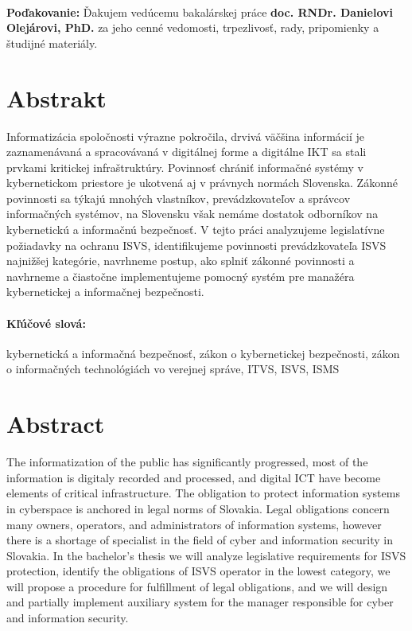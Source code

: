 \documentclass[12pt, twoside]{book}
\begin{document}


\newpage 
\pagestyle{plain}
~

\vfill
{\bf Poďakovanie:} Ďakujem vedúcemu bakalárskej práce \textbf{doc. RNDr. Danielovi Olejárovi, PhD.} za jeho cenné vedomosti,
trpezlivosť, rady, pripomienky a študijné materiály.


\newpage 
\section*{Abstrakt}
Informatizácia spoločnosti výrazne pokročila, drvivá väčšina informácií je zaznamenávaná a spracovávaná v digitálnej
forme a digitálne IKT sa stali prvkami kritickej infraštruktúry. Povinnosť chrániť informačné systémy v kybernetickom
priestore je ukotvená aj v právnych normách Slovenska. Zákonné povinnosti sa týkajú mnohých vlastníkov, prevádzkovateľov
a správcov informačných systémov, na Slovensku však nemáme dostatok odborníkov na kybernetickú a informačnú bezpečnosť.
V tejto práci analyzujeme legislatívne požiadavky na ochranu ISVS, identifikujeme povinnosti prevádzkovateľa ISVS
najnižšej kategórie, navrhneme postup, ako splniť zákonné povinnosti a navhrneme a čiastočne implementujeme pomocný
systém pre manažéra kybernetickej a informačnej bezpečnosti.


\paragraph*{Kľúčové slová:} 
kybernetická a informačná bezpečnosť,
zákon o kybernetickej bezpečnosti,
zákon o informačných technológiách vo verejnej správe,
ITVS,
ISVS,
ISMS


\newpage 
\section*{Abstract}
The informatization of the public has significantly progressed, most of the information is digitaly recorded
and processed, and digital ICT have become elements of critical infrastructure. The obligation to protect information
systems in cyberspace is anchored in legal norms of Slovakia. Legal obligations concern many owners, operators, and 
administrators of information systems, however there is a shortage of specialist in the field of cyber and information
security in Slovakia. In the bachelor's thesis we will analyze legislative requirements for ISVS protection, identify
the obligations of ISVS operator in the lowest category, we will propose a procedure for fulfillment of legal obligations,
and we will design and partially implement auxiliary system for the manager responsible for cyber and information security.
\end{document}
